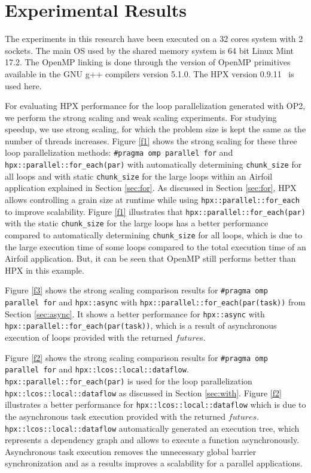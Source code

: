 \documentclass[conference]{IEEEtran}
\begin{document}

\section{Experimental Results}
\label{sec:res}

The experiments in this research have been executed on a 32 cores system with 2 sockets. The main OS used by the shared memory system is 64 bit Linux Mint 17.2. The OpenMP linking is done through the version of OpenMP primitives available in the GNU g++ compilers version 5.1.0. The HPX version 0.9.11~\cite{hpx_v0.9.11} is used here.
 
For evaluating HPX performance for the loop parallelization generated with OP2, we perform the strong scaling and weak scaling experiments. For studying speedup, we use strong scaling, for which the problem size is kept the same as the number of threads increases. Figure \ref{f1} shows the strong scaling for these three loop parallelization methods: \texttt{\#pragma omp parallel for} and \texttt{hpx::parallel::for\_each(par)} with automatically determining \texttt{chunk\_size} for all loops and with static \texttt{chunk\_size} for the large loops within an Airfoil application explained in Section \ref{sec:for}. As discussed in Section \ref{sec:for}, HPX allows controlling a grain size at runtime while using \texttt{hpx::parallel::for\_each} to improve scalability. Figure \ref{f1} illustrates that \texttt{hpx::parallel::for\_each(par)} with the static \texttt{chunk\_size} for the large loops has a better performance compared to automatically determining \texttt{chunk\_size} for all loops, which is due to the large execution time of some loops compared to the total execution time of an Airfoil application. But, it can be seen that OpenMP still performs better than HPX in this example.


Figure \ref{f3} shows the strong scaling comparison results for \texttt{\#pragma omp parallel for} and \texttt{hpx::async} with \texttt{hpx::parallel::for\_each(par(task))} from Section \ref{sec:async}. It shows a better performance for \texttt{hpx::async} with \texttt{hpx::parallel::for\_each(par(task))}, which is a result of asynchronous execution of loops provided with the returned $future$s.


Figure \ref{f2} shows the strong scaling comparison results for \texttt{\#pragma omp parallel for} and \texttt{hpx::lcos::local::dataflow}. \texttt{hpx::parallel::for\_each(par)} is used for the loop parallelization \texttt{hpx::lcos::local::dataflow} as discussed in Section \ref{sec:with}. Figure \ref{f2} illustrates a better performance for \texttt{hpx::lcos::local::dataflow} which is due to the asynchronous task execution provided with the returned $futures$. \texttt{hpx::lcos::local::dataflow} automatically generated an execution tree, which represents a dependency graph and allows to execute a function asynchronously. Asynchronous task execution removes the unnecessary global barrier synchronization and as a results improves a scalability for a parallel applications.    
\end{document}
